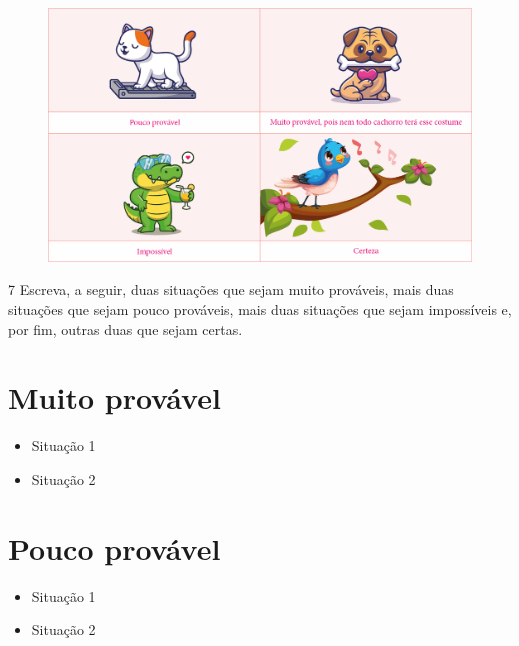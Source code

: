 \begin{figure}[htpb!]
\includegraphics[width=\textwidth]{./media/image88.png}
\end{figure}

\num{7} Escreva, a seguir, duas situações que sejam muito prováveis, mais duas
situações que sejam pouco prováveis, mais duas situações que sejam
impossíveis e, por fim, outras duas que sejam certas.


\section*{Muito provável}

\begin{itemize}
\item Situação 1
\end{itemize}

\begin{itemize}
\item Situação 2
\end{itemize}

\section*{Pouco provável}

\begin{itemize}
\item Situação 1
\end{itemize}

\begin{itemize}
\item Situação 2
\end{itemize}

